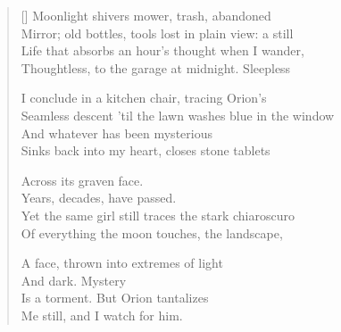 \label{ch:listening_to_neil_young}
\settowidth{\versewidth}{                                           Years, decades, have passed.}
\begin{verse}[\versewidth]
Moonlight shivers mower, trash, abandoned\\
Mirror; old bottles, tools lost in plain view: a still\\
Life that absorbs an hour's thought when I wander,\\
Thoughtless, to the garage at midnight.   Sleepless

I conclude in a kitchen chair, tracing Orion's\\
Seamless descent 'til the lawn washes blue in the window\\
And whatever has been mysterious\\
Sinks back into my heart, closes stone tablets

Across its graven face.       \\
                                           Years, decades, have passed.\\
Yet the same girl still traces the stark chiaroscuro\\
Of everything the moon touches, the landscape,

A face, thrown into extremes of light\\
And dark.     Mystery\\
Is a torment.     But Orion tantalizes\\
Me still, and I watch for him.
\end{verse}
